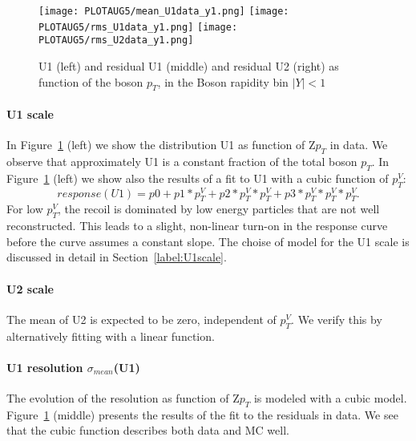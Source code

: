 \documentclass[41pt,a4paper,oneside]{report}
\begin{document}
\begin{figure}[h!]
  \begin{center}
    \texttt{[image: PLOTAUG5/mean\_U1data\_y1.png]}
    \texttt{[image: PLOTAUG5/rms\_U1data\_y1.png]}
    \texttt{[image: PLOTAUG5/rms\_U2data\_y1.png]}
    \caption{U1 (left) and residual U1 (middle) and residual U2 (right) as function of the boson $p_{T}$, in the Boson rapidity bin $|Y|<1$}
    \label{fig:UNBINNEDdata}
  \end{center}
\end{figure}


\paragraph{U1 scale}
In Figure~\ref{fig:UNBINNEDdata} (left) we show the distribution U1 as function of Z$p_{T}$ in data.
We observe that approximately U1 is a constant fraction of the total boson $p_{T}$.
In Figure~\ref{fig:UNBINNEDdata} (left) we show also the results of a fit to U1 with 
a cubic function of $p^{V}_{T}$: 
\begin{equation}
response(U1) = p0 + p1 * p^{V}_{T} + p2 * p^{V}_{T} * p^{V}_{T} + p3 * p^{V}_{T} * p^{V}_{T} * p^{V}_{T}.
\end{equation}
For low $p^{V}_{T}$, the recoil is dominated by low energy particles that are not well reconstructed.
This leads to a slight, non-linear turn-on in the response curve before the curve assumes a constant slope.
The choise of model for the U1 scale is discussed in detail in Section~\ref{label:U1scale}. 

\paragraph{U2 scale}
The mean of U2 is expected to be zero, independent of $p^{V}_{T}$. We verify this by alternatively fitting with a linear
function. 

\paragraph{U1 resolution $\sigma_{mean}$(U1)}
The evolution of the resolution as function of Z$p_{T}$ is modeled with a cubic model. 
Figure~\ref{fig:UNBINNEDdata} (middle) presents the results of the fit to the residuals in data.
We see that the cubic function describes both data and MC well. 
\end{document}
